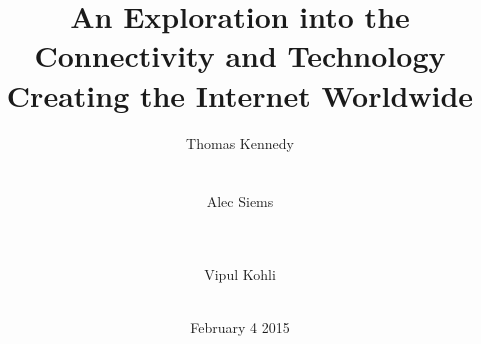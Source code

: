 \documentclass{sigcomm-alternate}
\begin{document}
%
\title{An Exploration into the Connectivity and Technology Creating the Internet Worldwide}
%
%
%
%
%
%
\author{
%
%
\alignauthor
{Thomas Kennedy}\\
       \\
       \\
\alignauthor
{Alec Siems}\\
       \\
       \\
\and  %
\alignauthor 
{Vipul Kohli}\\
       \\
}
\date{February 4 2015}
\end{document}
